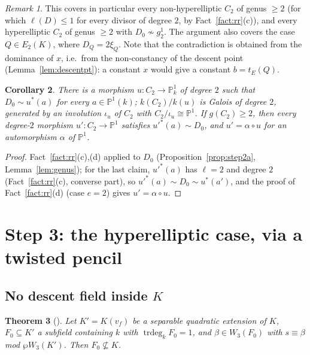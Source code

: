 \documentclass[11pt]{amsart}
\newtheorem{theorem}{Theorem}[section]
\newtheorem{corollary}[theorem]{Corollary}
\theoremstyle{definition}
\theoremstyle{remark}
\newtheorem{remark}[theorem]{Remark}
\newcommand{\tr}{\operatorname{trdeg}}
\newcommand{\PP}{\mathbb P}
\begin{document}
\begin{remark}
This covers in particular every non-hyperelliptic $C_2$ of genus $\ge2$ (for which
$\ell(D)\le1$ for every divisor of degree $2$, by Fact~\ref{fact:rr}(c)), and every
hyperelliptic $C_2$ of genus $\ge2$ with $D_0\not\sim g^1_2$. The argument also covers the
case $Q\in E_2(K)$, where $D_Q=2\xi_Q$. Note that the contradiction is obtained from the
dominance of $x$, i.e.\ from the non-constancy of the descent point
(Lemma~\ref{lem:descentpt}): a constant $x$ would give a constant $b=t_E(Q)$.
\end{remark}

\begin{corollary}\label{cor:pencil}
There is a morphism $u\colon C_2\to\PP^1_k$ of degree $2$ such that $D_0\sim u^*(a)$ for
every $a\in\PP^1(k)$; $k(C_2)/k(u)$ is Galois of degree $2$, generated by an involution
$\iota_u$ of $C_2$ with $C_2/\iota_u\cong\PP^1$. If $g(C_2)\ge2$, then \emph{every}
degree-$2$ morphism $u'\colon C_2\to\PP^1$ satisfies $u'^*(a)\sim D_0$, and
$u'=\alpha\circ u$ for an automorphism $\alpha$ of $\PP^1$.
\end{corollary}

\begin{proof}
Fact~\ref{fact:rr}(c),(d) applied to $D_0$ (Proposition~\ref{prop:step2a},
Lemma~\ref{lem:genus}); for the last claim, $u'^*(a)$ has $\ell=2$ and degree $2$
(Fact~\ref{fact:rr}(c), converse part), so $u'^*(a)\sim D_0\sim u^*(a')$, and the proof of
Fact~\ref{fact:rr}(d) (case $e=2$) gives $u'=\alpha\circ u$.
\end{proof}

\section{Step 3: the hyperelliptic case, via a twisted pencil}\label{sec:step3}

\subsection{No descent field inside \texorpdfstring{$K$}{K}}

\begin{theorem}[{\cite[Theorem 11.6(b)]{A}}]\label{thm:caseA}
Let $K'=K(v_f)$ be a separable quadratic extension of $K$, $F_0\subseteq K'$ a subfield
containing $k$ with $\tr_kF_0=1$, and $\beta\in W_3(F_0)$ with $s\equiv\beta$ mod
$\wp W_3(K')$. Then $F_0\not\subseteq K$.
\end{theorem}
\end{document}
